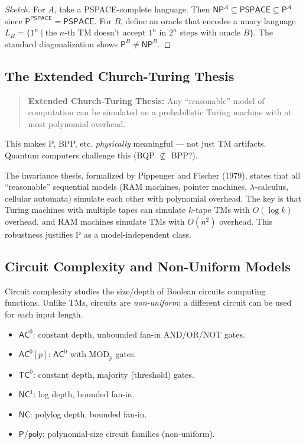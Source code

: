 \begin{proof}[Sketch]
For $A$, take a PSPACE-complete language. Then $\mathsf{NP}^A \subseteq \mathsf{PSPACE} \subseteq \mathsf{P}^A$ since $\mathsf{P}^{\mathsf{PSPACE}} = \mathsf{PSPACE}$. For $B$, define an oracle that encodes a unary language $L_B = \{ 1^n \mid \text{the } n\text{-th TM doesn't accept } 1^n \text{ in } 2^n \text{ steps with oracle } B \}$. The standard diagonalization shows $\mathsf{P}^B \neq \mathsf{NP}^B$.
\end{proof}

\subsection{The Extended Church-Turing Thesis}
\label{sec:complexity:ect}

\begin{quote}
\textbf{Extended Church-Turing Thesis:} Any ``reasonable'' model of computation can be simulated on a probabilistic Turing machine with at most polynomial overhead.
\end{quote}

This makes P, BPP, etc. \emph{physically} meaningful — not just TM artifacts. Quantum computers challenge this (BQP $\not\subseteq$ BPP?).

The invariance thesis, formalized by Pippenger and Fischer (1979), states that all ``reasonable'' sequential models (RAM machines, pointer machines, $\lambda$-calculus, cellular automata) simulate each other with polynomial overhead. The key is that Turing machines with multiple tapes can simulate $k$-tape TMs with $O(\log k)$ overhead, and RAM machines simulate TMs with $O(n^2)$ overhead. This robustness justifies P as a model-independent class.

\subsection{Circuit Complexity and Non-Uniform Models}
\label{sec:complexity:circuits}

Circuit complexity studies the size/depth of Boolean circuits computing functions. Unlike TMs, circuits are \emph{non-uniform}: a different circuit can be used for each input length.

\begin{definition}
\begin{itemize}
\item $\mathsf{AC}^0$: constant depth, unbounded fan-in AND/OR/NOT gates.
\item $\mathsf{AC}^0[p]$: $\mathsf{AC}^0$ with MOD$_p$ gates.
\item $\mathsf{TC}^0$: constant depth, majority (threshold) gates.
\item $\mathsf{NC}^1$: log depth, bounded fan-in.
\item $\mathsf{NC}$: polylog depth, bounded fan-in.
\item $\mathsf{P}/\mathsf{poly}$: polynomial-size circuit families (non-uniform).
\end{itemize}
\end{definition}

